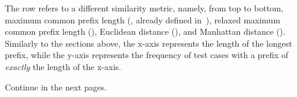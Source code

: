 The row refers to a different similarity metric, namely, from top to bottom, maximum common prefix length (\mcpl, already defined in~), relaxed maximum common prefix length (\rmcpl), Euclidean distance (\euclidean), and Manhattan distance (\manhattan).
Similarly to the sections above, the x-axis represents the length of the longest prefix, while the y-axis represents the frequency of test cases with a prefix of \textit{exactly} the length of the x-axis.

Continue in the next pages.
%



